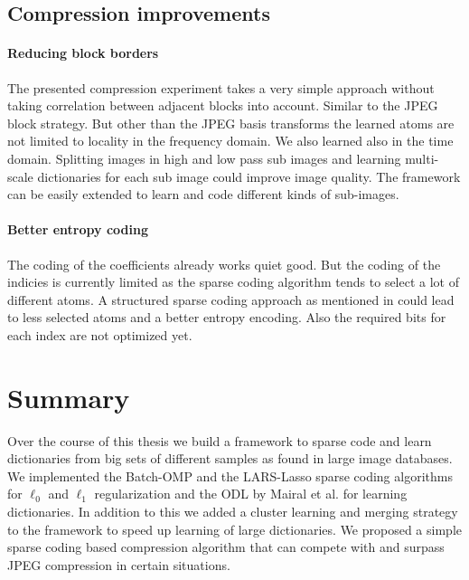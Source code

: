 \subsection{Compression improvements}

\paragraph{Reducing block borders} The presented compression experiment
takes a very simple approach without taking correlation between adjacent
blocks into account. Similar to the JPEG block strategy. But other than
the JPEG basis transforms the learned atoms are not limited to locality in the
frequency domain. We also learned also in the time domain. 
Splitting images in high and low pass sub images and learning multi-scale
dictionaries for each sub image could improve image quality. The framework can
be easily extended to learn and code different kinds of sub-images.

\paragraph{Better entropy coding}
The coding of the coefficients already works quiet good. But the coding of the
indicies is currently limited as the sparse coding algorithm tends to select a
lot of different atoms. A structured sparse coding approach as mentioned in
 could lead to less selected atoms and a better
entropy encoding. Also the required bits for each index are not optimized yet.


\section{Summary}
Over the course of this thesis we build a framework to sparse code and learn
dictionaries from big sets of different samples as found in large image
databases. We implemented the Batch-OMP and the LARS-Lasso sparse coding
algorithms for $\ell_0$ and $\ell_1$ regularization and the ODL by Mairal et
al. for learning dictionaries. 
In addition to this we added a cluster learning and merging strategy to the
framework to speed up learning of large dictionaries.
We proposed a simple sparse coding based compression algorithm that can compete
with and surpass JPEG compression in certain situations.









